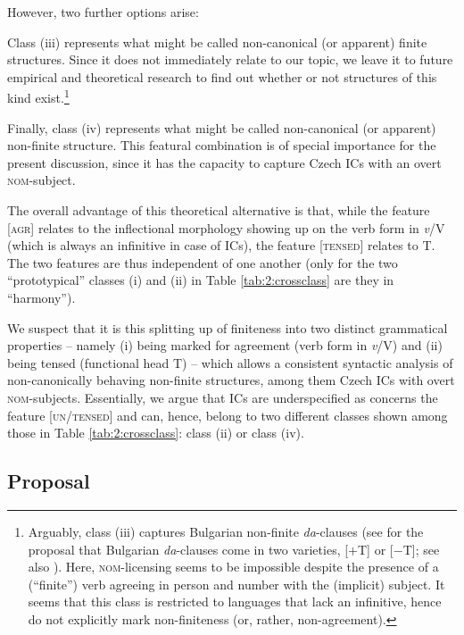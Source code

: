 \documentclass[output=paper,colorlinks,citecolor=brown,
modfonts,newtxmath
]{langscibook}
\begin{document}
However, two further options arise:

Class (iii) represents what might be called non-canonical (or apparent) finite structures. Since it does not immediately relate to our topic, we leave it to future empirical and theoretical research to find out whether or not structures of this kind exist.\footnote{Arguably, class (iii) captures Bulgarian non-finite \textit{da}-clauses (see \citealt{KrapovaPetkov1999} for the proposal that Bulgarian \textit{da}-clauses come in two varieties, [$+$T] or [$-$T]; see also \citealt{Pitsch2018}). Here, \textsc{nom}-licensing seems to be impossible despite the presence of a (``finite'') verb agreeing in person and number with the (implicit) subject. It seems that this class is restricted to languages that lack an infinitive, hence do not explicitly mark non-finiteness (or, rather, non-agreement).}

Finally, class (iv) represents what might be called non-cano\-nical (or apparent) non-finite structure. This featural combination is of special importance for the present discussion, since it has the capacity to capture Czech ICs with an overt \textsc{nom}-subject.

The overall advantage of this theoretical alternative is that, while the feature [\textsc{agr}] relates to the inflectional morphology showing up on the verb form in \textit{v}/V (which is always an infinitive in case of ICs), the feature [\textsc{tensed}] relates to T. The two features are thus independent of one another (only for the two ``prototypical'' classes (i) and (ii) in Table \ref{tab:2:crossclass} are they in ``harmony'').

We suspect that it is this splitting up of finiteness into two distinct grammatical properties -- namely (i) being marked for agreement (verb form in \textit{v}/V) and (ii) being tensed (functional head T) -- which allows a consistent syntactic analysis of non-canonically behaving non-finite structures, among them Czech ICs with overt \textsc{nom}-subjects. Essentially, we argue that ICs are underspecified as concerns the feature [\textsc{un/tensed}] and can, hence, belong to two different classes shown among those in Table \ref{tab:2:crossclass}: class (ii) or class (iv).


\subsection{Proposal}\label{sec:nom_proposal}
\end{document}
